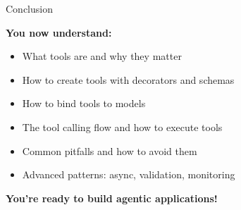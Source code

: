 \documentclass[aspectratio=169,11pt]{beamer}
\begin{document}
\begin{frame}[fragile]{Conclusion}
\begin{center}
\Large
\textbf{You now understand:}

\vfill

\normalsize
\begin{itemize}\setlength{\itemsep}{1pt}
  \item What tools are and why they matter
  \item How to create tools with decorators and schemas
  \item How to bind tools to models
  \item The tool calling flow and how to execute tools
  \item Common pitfalls and how to avoid them
  \item Advanced patterns: async, validation, monitoring
\end{itemize}

\vfill

\large
\textcolor{lcgreen}{\textbf{You're ready to build agentic applications!}}
\end{center}
\end{frame}
\end{document}
